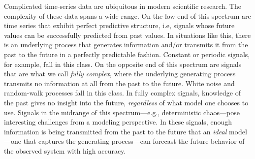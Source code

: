 



%

Complicated time-series data are ubiquitous in modern scientific
research.  The complexity of these data spans a wide range.  On the
low end of this spectrum are time series that exhibit perfect
predictive structure, i.e, signals whose future values can be
successfully predicted from past values.  In situations like this,
there is an underlying process that generates information and/or
transmits it from the past to the future in a perfectly predictable
fashion.  Constant or periodic signals, for example, fall in this
class.  On the opposite end of this spectrum are signals that are what
we call \emph{fully complex}, where the underlying generating process
transmits no information at all from the past to the future.  White
noise and random-walk processes fall in this class.  In fully complex
signals, knowledge of the past gives no insight into the future,
\emph{regardless} of what model one chooses to use.  Signals in the
midrange of this spectrum---e.g., deterministic chaos---pose
interesting challenges from a modeling perspective.  In these signals,
enough information is being transmitted from the past to the future
that an \emph{ideal} model---one that captures the generating
process---can forecast the future behavior of the observed system with
high accuracy.

